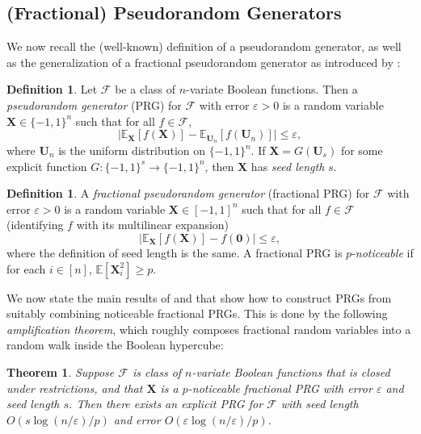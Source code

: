\documentclass[10pt,a4paper]{article}
\newcommand{\eps}{\varepsilon}
\newtheorem{THM}[theorem]{Theorem}
\theoremstyle{definition}
\newtheorem{definition}[theorem]{Definition}
\begin{document}
\subsection{(Fractional) Pseudorandom Generators}
We now recall the (well-known) definition of a pseudorandom generator, as well as the generalization of a fractional pseudorandom generator as introduced by \cite{CHHL}:

\begin{definition}
Let $\mathcal{F}$ be a class of $n$-variate Boolean functions. Then a \emph{pseudorandom generator} (PRG) for $\mathcal{F}$ with error $\eps>0$ is a random variable $\mathbf{X}\in \{-1,1\}^n$ such that for all $f\in \mathcal{F}$,
\begin{equation*}
    \vert \mathbb{E}_{\mathbf{X}}[f(\mathbf{X})]-\mathbb{E}_{\mathbf{U}_n}[f(\mathbf{U}_n)]\vert \leq \eps,
\end{equation*}
where $\mathbf{U}_n$ is the uniform distribution on $\{-1,1\}^n$. If $\mathbf{X}=G(\mathbf{U}_s)$ for some explicit function $G:\{-1,1\}^s\to \{-1,1\}^n$, then $\mathbf{X}$ has \emph{seed length} $s$.
\end{definition}

\begin{definition}\label{def:fprg}
A \emph{fractional pseudorandom generator} (fractional PRG) for $\mathcal{F}$ with error $\eps>0$ is a random variable $\mathbf{X}\in [-1,1]^n$ such that for all $f\in \mathcal{F}$ (identifying $f$ with its multilinear expansion)
\begin{equation*}
    \vert \mathbb{E}_{\mathbf{X}}[f(\mathbf{X})]-f(\mathbf{0})\vert \leq \eps,
\end{equation*}
where the definition of seed length is the same. A fractional PRG is $p$-\emph{noticeable} if for each $i\in [n]$, $\mathbb{E}[\mathbf{X}_i^2]\geq p$.
\end{definition}

We now state the main results of \cite{CHHL} and \cite{CHLT} that show how to construct PRGs from suitably combining noticeable fractional PRGs. This is done by the following \emph{amplification theorem}, which roughly composes fractional random variables into a random walk inside the Boolean hypercube:

\begin{THM}
\label{thm:amplification}
Suppose $\mathcal{F}$ is class of $n$-variate Boolean functions that is closed under restrictions, and that $\mathbf{X}$ is a $p$-noticeable fractional PRG with error $\eps$ and seed length $s$. Then there exists an explicit PRG for $\mathcal{F}$ with seed length $O(s\log(n/\eps)/p)$ and error $O(\eps\log(n/\eps)/p)$.
\end{THM}
\end{document}
